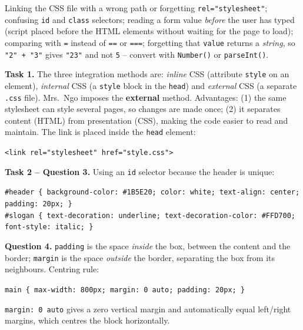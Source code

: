 \documentclass[11pt]{article}
\newcounter{popsec}
\newcounter{popsub}
\newcommand{\courssub}[1]{%
  \stepcounter{popsub}%
  \par\vspace{9pt}\noindent{\popxbold\fontsize{11.5}{13}\selectfont\color{popink}{\color{poporange}\thepopsec.\thepopsub}\hspace{6pt}#1}\par\nopagebreak\vspace{4pt}
}
\begin{document}
\begin{attention}
Linking the CSS file with a wrong path or forgetting \texttt{rel="stylesheet"}; confusing \texttt{id} and \texttt{class} selectors; reading a form value \emph{before} the user has typed (script placed before the HTML elements without waiting for the page to load); comparing with \texttt{=} instead of \texttt{==} or \texttt{===}; forgetting that \texttt{value} returns a \emph{string}, so \texttt{"2" + "3"} gives \texttt{"23"} and not \texttt{5} -- convert with \texttt{Number()} or \texttt{parseInt()}.
\end{attention}

\courssub{Model answer}

\textbf{Task 1.} The three integration methods are: \emph{inline} CSS (attribute \texttt{style} on an element), \emph{internal} CSS (a \texttt{style} block in the \texttt{head}) and \emph{external} CSS (a separate \texttt{.css} file). Mrs.\ Ngo imposes the \textbf{external} method. Advantages: (1) the same stylesheet can style several pages, so changes are made once; (2) it separates content (HTML) from presentation (CSS), making the code easier to read and maintain. The link is placed inside the \texttt{head} element:

\begin{center}
\texttt{<link rel="stylesheet" href="style.css">}
\end{center}

\textbf{Task 2 -- Question 3.} Using an \texttt{id} selector because the header is unique:

\begin{center}
\texttt{\#header \{ background-color: \#1B5E20; color: white; text-align: center; padding: 20px; \}}\\
\texttt{\#slogan \{ text-decoration: underline; text-decoration-color: \#FFD700; font-style: italic; \}}
\end{center}

\textbf{Question 4.} \texttt{padding} is the space \emph{inside} the box, between the content and the border; \texttt{margin} is the space \emph{outside} the border, separating the box from its neighbours. Centring rule:

\begin{center}
\texttt{main \{ max-width: 800px; margin: 0 auto; padding: 20px; \}}
\end{center}

\texttt{margin: 0 auto} gives a zero vertical margin and automatically equal left/right margins, which centres the block horizontally.
\end{document}
